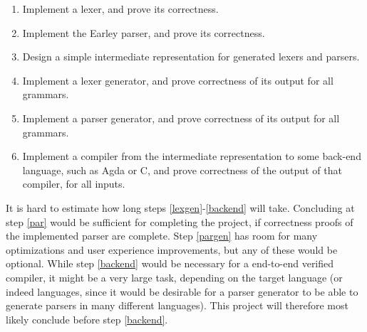\documentclass{article}
\begin{document}
	\begin{enumerate}

%

		\item \label{lex}
			
			Implement a lexer, and prove its correctness.

		\item \label{par}
			
			Implement the Earley parser, and prove its correctness.
		
		\item \label{dsl}
			
			Design a simple intermediate representation for generated lexers
			and parsers. 

		\item \label{lexgen}
			
			Implement a lexer generator, and prove correctness of its output
			for all grammars.

		\item \label{pargen}
			
			Implement a parser generator, and prove correctness of its output
			for all grammars.
		
		\item \label{backend}

			Implement a compiler from the intermediate representation to some
			back-end language, such as Agda or C, and prove correctness of the
			output of that compiler, for all inputs.

	\end{enumerate}
	
	It is hard to estimate how long steps \ref{lexgen}-\ref{backend} will take.
	Concluding at step \ref{par} would be sufficient for completing the
	project, if correctness proofs of the implemented parser are complete.
	Step \ref{pargen} has room for many optimizations and user experience
	improvements, but any of these would be optional. While step \ref{backend}
	would be necessary for a end-to-end verified compiler, it might be a very
	large task, depending on the target language (or indeed languages, since it
	would be desirable for a parser generator to be able to generate parsers in
	many different languages). This project will therefore most likely conclude
	before step \ref{backend}.
\end{document}
